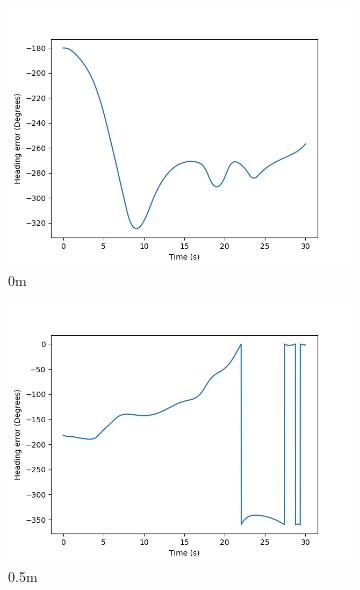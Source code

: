 \documentclass[class=article, crop=false]{standalone}
\begin{document}
\begin{figure}
    \centering
    \begin{subfigure}[b]{0.48\textwidth}
        \centering
        \includegraphics{scenario1/rov-100m/0.0m/usv_heading_error_controlled}
        \caption{0m}
        \label{}
    \end{subfigure}
    \hfill
    \begin{subfigure}[b]{0.48\textwidth}
        \centering
        \includegraphics{scenario1/rov-100m/0.5m/usv_heading_error_controlled}
        \caption{0.5m}
        \label{}
    \end{subfigure}
    \vfill
    \begin{subfigure}[b]{0.48\textwidth}
        \centering

\end{subfigure}
\end{figure}
\end{document}
